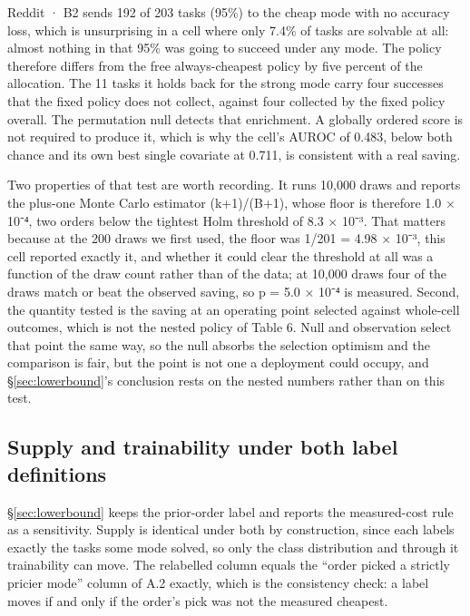 Reddit · B2 sends 192 of 203 tasks (95\%) to the cheap mode with no accuracy loss, which is unsurprising in a cell where only 7.4\% of tasks are solvable at all: almost nothing in that 95\% was going to succeed under any mode. The policy therefore differs from the free always-cheapest policy by five percent of the allocation. The 11 tasks it holds back for the strong mode carry four successes that the fixed policy does not collect, against four collected by the fixed policy overall. The permutation null detects that enrichment. A globally ordered score is not required to produce it, which is why the cell's AUROC of 0.483, below both chance and its own best single covariate at 0.711, is consistent with a real saving.

Two properties of that test are worth recording. It runs 10,000 draws and reports the plus-one Monte Carlo estimator (k+1)/(B+1), whose floor is therefore 1.0 × 10⁻⁴, two orders below the tightest Holm threshold of 8.3 × 10⁻³. That matters because at the 200 draws we first used, the floor was 1/201 = 4.98 × 10⁻³, this cell reported exactly it, and whether it could clear the threshold at all was a function of the draw count rather than of the data; at 10,000 draws four of the draws match or beat the observed saving, so p = 5.0 × 10⁻⁴ is measured. Second, the quantity tested is the saving at an operating point selected against whole-cell outcomes, which is not the nested policy of Table 6. Null and observation select that point the same way, so the null absorbs the selection optimism and the comparison is fair, but the point is not one a deployment could occupy, and \S\ref{sec:lowerbound}'s conclusion rests on the nested numbers rather than on this test.

\subsection{Supply and trainability under both label definitions}\label{supply-and-trainability-under-both-label-definitions}

\S\ref{sec:lowerbound} keeps the prior-order label and reports the measured-cost rule as a sensitivity. Supply is identical under both by construction, since each labels exactly the tasks some mode solved, so only the class distribution and through it trainability can move. The relabelled column equals the ``order picked a strictly pricier mode'' column of A.2 exactly, which is the consistency check: a label moves if and only if the order's pick was not the measured cheapest.

